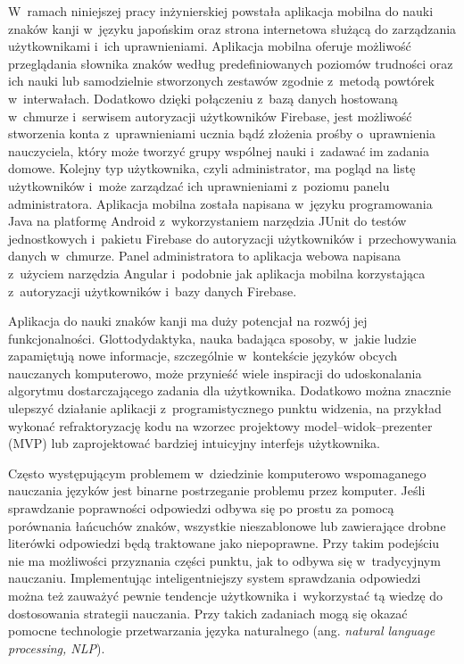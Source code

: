 \documentclass[a4paper,twoside,12pt]{book}
\newcommand{\obcy}[1]{\emph{#1}}
\newcommand{\english}[1]{{\selectlanguage{british}\obcy{#1}}}
\begin{document}


W~ramach niniejszej pracy inżynierskiej powstała aplikacja mobilna do nauki znaków kanji w~języku japońskim oraz strona internetowa służącą do zarządzania użytkownikami i~ich uprawnieniami. Aplikacja mobilna oferuje możliwość przeglądania słownika znaków według predefiniowanych poziomów trudności oraz ich nauki lub samodzielnie stworzonych zestawów zgodnie z~metodą powtórek w~interwałach. Dodatkowo dzięki połączeniu z~bazą danych hostowaną w~chmurze i~serwisem autoryzacji użytkowników Firebase, jest możliwość stworzenia konta z~uprawnieniami ucznia bądź złożenia prośby o~uprawnienia nauczyciela, który może tworzyć grupy wspólnej nauki i~zadawać im zadania domowe. Kolejny typ użytkownika, czyli administrator, ma pogląd na listę użytkowników i~może zarządzać ich uprawnieniami z~poziomu panelu administratora. Aplikacja mobilna została napisana w~języku programowania Java na platformę Android z~wykorzystaniem narzędzia JUnit do testów jednostkowych i~pakietu Firebase do autoryzacji użytkowników i~przechowywania danych w~chmurze. Panel administratora to aplikacja webowa napisana z~użyciem narzędzia Angular i~podobnie jak aplikacja mobilna korzystająca z~autoryzacji użytkowników i~bazy danych Firebase. 

Aplikacja do nauki znaków kanji ma duży potencjał na rozwój jej funkcjonalności. Glottodydaktyka, nauka badająca sposoby, w~jakie ludzie zapamiętują nowe informacje, szczególnie w~kontekście języków obcych nauczanych komputerowo, może przynieść wiele inspiracji do udoskonalania algorytmu dostarczającego zadania dla użytkownika. Dodatkowo można znacznie ulepszyć działanie aplikacji z~programistycznego punktu widzenia, na przykład wykonać refraktoryzację kodu na wzorzec projektowy model--widok--prezenter (MVP) lub zaprojektować bardziej intuicyjny interfejs użytkownika.

Często występującym problemem w~dziedzinie komputerowo wspomaganego nauczania języków jest binarne postrzeganie problemu przez komputer. Jeśli sprawdzanie poprawności odpowiedzi odbywa się po prostu za pomocą porównania łańcuchów znaków, wszystkie nieszablonowe lub zawierające drobne literówki odpowiedzi będą traktowane jako niepoprawne. Przy takim podejściu nie ma możliwości przyznania części punktu, jak to odbywa się w~tradycyjnym nauczaniu. Implementując inteligentniejszy system sprawdzania odpowiedzi można też zauważyć pewnie tendencje użytkownika i~wykorzystać tą wiedzę do dostosowania strategii nauczania. Przy takich zadaniach mogą się okazać pomocne technologie przetwarzania języka naturalnego (ang. \english{natural language processing, NLP}).
\end{document}
